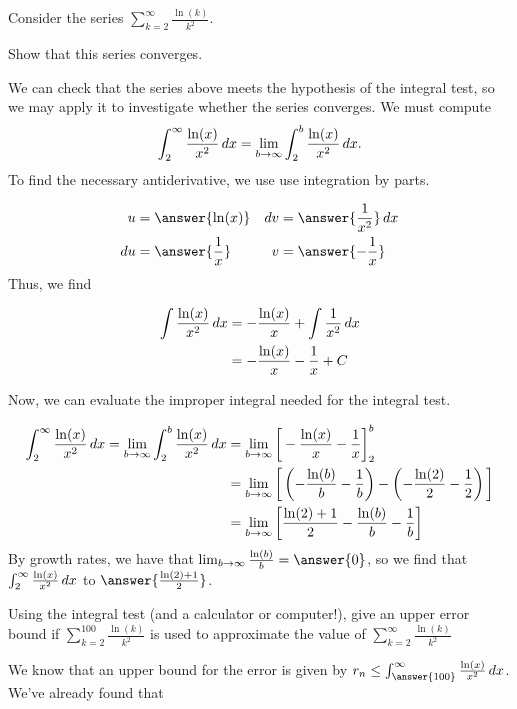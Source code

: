 \documentclass{ximera}
\begin{document}
\begin{example}
Consider the series $\sum_{k=2}^{\infty} \frac{\ln(k)}{k^2}$.  

\begin{example}
Show that this series converges. 
\begin{explanation}
We can check that the series above meets the hypothesis of the integral test, so we may apply it to investigate whether the series converges.
We must compute 
\begin{align*}
\int_{2}^{\infty} \frac{\ln(x)}{x^2} \mathop{}\!d x &= \lim_{b \to \infty} \int_2^b  \frac{\ln(x)}{x^2} \mathop{}\!d x .\\
\end{align*}
To find the necessary antiderivative, we use use integration by parts.

\begin{align*}
u&= \answer{\ln(x)} & \d v&= \answer{\frac{1}{x^2}} \d x \\
\d u &= \answer{\frac{1}{x}} & v&= \answer{-\frac{1}{x}}
\end{align*}
Thus, we find

\begin{align*}
\int  \frac{\ln(x)}{x^2} \mathop{}\!d x &= -\frac{\ln(x)}{x} + \int \frac{1}{x^2} \mathop{}\!d x \\
&= -\frac{\ln(x)}{x} - \frac{1}{x} +C
\end{align*}

Now, we can evaluate the improper integral needed for the integral test.

\begin{align*}
\int_{2}^{\infty} \frac{\ln(x)}{x^2} \mathop{}\!d x = \lim_{b \to \infty} \int_2^b  \frac{\ln(x)}{x^2} \mathop{}\!d x &= \lim_{b \to \infty} \bigg[ -\frac{\ln(x)}{x} - \frac{1}{x} \bigg]_2^b\\
&= \lim_{b \to \infty} \bigg[ \left(-\frac{\ln(b)}{b} - \frac{1}{b}\right) - \left(-\frac{\ln(2)}{2} - \frac{1}{2}\right) \bigg]\\
&= \lim_{b \to \infty} \bigg[ \frac{\ln(2)+1}{2}-\frac{\ln(b)}{b} - \frac{1}{b} \bigg]
\end{align*}
By growth rates, we have that $\lim_{b \to \infty} \frac{\ln(b)}{b} = \answer{0}$, so we find that $\int_{2}^{\infty} \frac{\ln(x)}{x^2} \mathop{}\!d x$  to $\answer{\frac{\ln(2)+1}{2}}$.
 
\end{explanation}
\end{example}

\begin{example}
Using the integral test (and a calculator or computer!), give an upper error bound if $\sum_{k=2}^{100}  \frac{\ln(k)}{k^2}$ is used to approximate the value of $\sum_{k=2}^{\infty}  \frac{\ln(k)}{k^2}$
\begin{explanation}
We know that an upper bound for the error is given by $r_n \leq \int_{\answer{100}}^{\infty} \frac{\ln(x)}{x^2} \d x$.  We've already found that 


\end{explanation}
\end{example}
\end{example}
\end{document}

